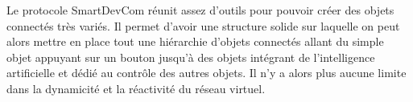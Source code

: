 		Le protocole SmartDevCom réunit assez d'outils pour pouvoir créer des objets connectés très 
		variés. Il permet d'avoir une structure solide sur laquelle on peut alors mettre en place 
		tout une hiérarchie d'objets connectés allant du simple objet appuyant sur un bouton jusqu'à
		des objets intégrant de l'intelligence artificielle et dédié au contrôle des autres objets.
		Il n'y a alors plus aucune limite dans la dynamicité et la réactivité du réseau virtuel.

